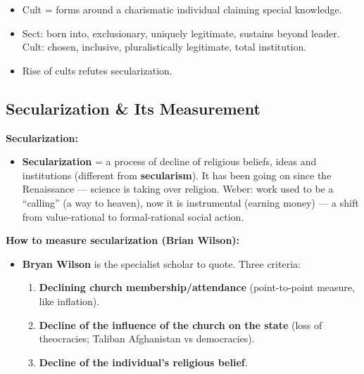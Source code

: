 \begin{QuickRevision}
\begin{itemize}
\item Cult = forms around a charismatic individual claiming special knowledge.
\item Sect: born into, exclusionary, uniquely legitimate, sustains beyond leader. Cult: chosen, inclusive, pluralistically legitimate, total institution.
\item Rise of cults refutes secularization.
\end{itemize}
\end{QuickRevision}

\sectiondivider

\subsection{Secularization \& Its Measurement}

\begin{KeyConcept}
\textbf{Secularization:}
\begin{itemize}
\item \textbf{Secularization} = a process of decline of religious beliefs, ideas and institutions (different from \textbf{secularism}). It has been going on since the Renaissance --- science is taking over religion. Weber: work used to be a ``calling'' (a way to heaven), now it is instrumental (earning money) --- a shift from value-rational to formal-rational social action.
\end{itemize}
\end{KeyConcept}

\begin{DataFact}
\textbf{How to measure secularization (Brian Wilson):}
\begin{itemize}
\item \textbf{Bryan Wilson} is the specialist scholar to quote. Three criteria:
\begin{enumerate}
\item \textbf{Declining church membership/attendance} (point-to-point measure, like inflation).
\item \textbf{Decline of the influence of the church on the state} (loss of theocracies; Taliban Afghanistan vs democracies).
\item \textbf{Decline of the individual's religious belief}.
\end{enumerate}
\end{itemize}
\end{DataFact}

